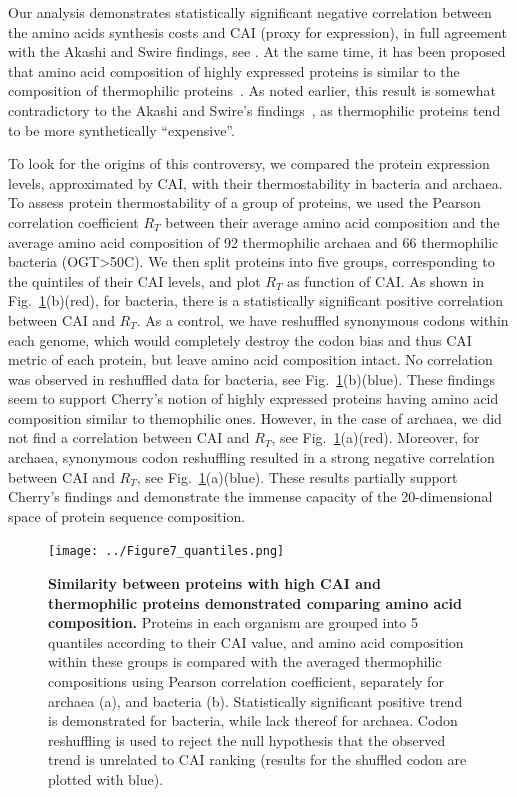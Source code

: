 \documentclass[10pt,letterpaper]{article}
\begin{document}
Our analysis demonstrates statistically significant negative correlation between the amino acids synthesis costs and CAI (proxy for expression), in full agreement with the Akashi and Swire findings, see . At the same time, it has been proposed that amino acid composition of highly expressed proteins is similar to the composition of thermophilic proteins~\cite{Cherry2010Highly}. As noted earlier, this result is somewhat contradictory to the Akashi and Swire's findings~\cite{Serohijos2012Protein}, as thermophilic proteins tend to be more synthetically ``expensive''.


To look for the origins of this controversy, we compared the protein expression levels, approximated by CAI, with their thermostability in bacteria and archaea. To assess protein thermostability of a group of proteins, we used the Pearson correlation coefficient $R_T$ between their average amino acid composition and the average amino acid composition of 92 thermophilic archaea and 66 thermophilic bacteria (OGT>50\textdegree C).  We then split proteins into five groups, corresponding to the quintiles of their CAI levels, and plot $R_T$ as function of CAI. As shown in Fig.~\ref{fig:fig7}(b)(red), for bacteria, there is a statistically significant positive correlation between CAI and $R_T$. As a control, we have reshuffled synonymous codons within each genome, which would completely destroy the codon bias and thus CAI metric of each protein, but leave amino acid composition intact. No correlation was observed in reshuffled data for bacteria, see Fig.~\ref{fig:fig7}(b)(blue). These findings seem to support Cherry's notion of highly expressed proteins having amino acid composition similar to themophilic ones. However, in the case of archaea, we did not find a correlation between CAI and $R_T$, see Fig.~\ref{fig:fig7}(a)(red). Moreover, for archaea, synonymous codon reshuffling resulted in a strong negative correlation between CAI and $R_T$, see Fig.~\ref{fig:fig7}(a)(blue). These results partially support Cherry's findings and demonstrate the immense capacity of the 20-dimensional space of protein sequence composition. 

\begin{figure}[h!]
\texttt{[image: ../Figure7\_quantiles.png]}
\caption{
{\bf Similarity between proteins with high CAI and thermophilic proteins demonstrated comparing amino acid composition.}
Proteins in each organism are grouped into 5 quantiles according to their CAI value, and amino acid composition within these groups is compared with the averaged thermophilic compositions using Pearson correlation coefficient, separately for archaea (a), and bacteria (b). Statistically significant positive trend is demonstrated for bacteria, while lack thereof for archaea. Codon reshuffling is used to reject the null hypothesis that the observed trend is unrelated to CAI ranking (results for the shuffled codon are plotted with blue).
}
\label{fig:fig7}
\end{figure}
\end{document}
